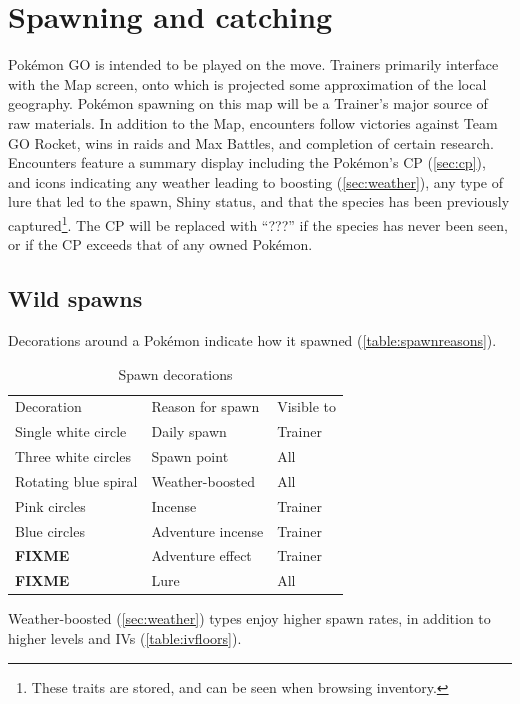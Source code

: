 \chapter{Spawning and catching}
\label{chap:spawn}
Pokémon GO is intended to be played on the move.
Trainers primarily interface with the Map screen, onto which is projected
  some approximation of the local geography.
Pokémon spawning on this map will be a Trainer's major source of raw materials.
In addition to the Map, encounters follow victories against Team GO Rocket,
  wins in raids and Max Battles, and completion of certain research.
Encounters feature a summary display including the Pokémon's CP (\autoref{sec:cp}),
  and icons indicating any weather leading to boosting (\autoref{sec:weather}),
  any type of lure that led to the spawn,
  Shiny status,
  and that the species has been previously captured\footnote{These traits are stored, and can be seen when browsing inventory.}.
The CP will be replaced with ``???'' if the species has never been seen, or if
  the CP exceeds that of any owned Pokémon.

\section{Wild spawns}
\label{sec:spawns}
Decorations around a Pokémon indicate how it spawned (\autoref{table:spawnreasons}).
\begin{table}
\centering
\begin{tabular}{lll}
  Decoration & Reason for spawn & Visible to\\
\Midrule
  Single white circle & Daily spawn & Trainer\\
  Three white circles & Spawn point & All\\
  Rotating blue spiral & Weather-boosted & All\\
  Pink circles & Incense & Trainer\\
  Blue circles & Adventure incense & Trainer\\
  \textbf{FIXME} & Adventure effect & Trainer\\
  \textbf{FIXME} & Lure & All\\
\end{tabular}
\caption{Spawn decorations}
\label{table:spawnreasons}
\end{table}
Weather-boosted (\autoref{sec:weather}) types enjoy higher spawn rates,
  in addition to higher levels and IVs (\autoref{table:ivfloors}).

